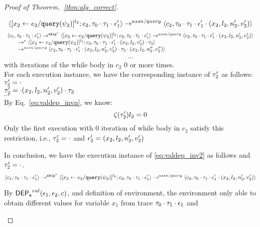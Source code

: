 \begin{proof}[Proof of Theorem.~\ref{thm:alg_correct}]
\begin{case}[$P(\cdot)$]
\begin{subproof}[Subproof]
\begin{enumerate}
\[  \langle [\mathrel{ {x}_2 \leftarrow e_2 / {\tt query}(\psi_2) }]^{l_2} ; {c}_2, \mathtt{\tau}_0 \cdot \mathtt{\tau}_1 \cdot \mathtt{\epsilon}_1' \rangle 
  \rightarrow^{assn/query} 
  \langle {c}_2,  \mathtt{\tau}_0 \cdot \mathtt{\tau}_1 \cdot \mathtt{\epsilon}_1' \cdot (x_2, l_2, n_2', v_2') \rangle 
 \]
%
  \[
  \begin{array}{l}
  \langle c_1, \mathtt{\tau}_0 \cdot \mathtt{\tau}_1 \cdot \mathtt{\epsilon}_1' \rangle 
  \rightarrow^{\mathtt{skip}^*} 
  \langle [\mathrel{ {x}_2 \leftarrow e_2 / {\tt query}(\psi_2) }]^{l_2} ; {c}_2, \mathtt{\tau}_0 \cdot \mathtt{\tau}_1 \cdot \mathtt{\epsilon}_1' \rangle 
  \rightarrow^{assn/query} 
  \langle {c}_2,  \mathtt{\tau}_0 \cdot \mathtt{\tau}_1 \cdot \mathtt{\epsilon}_1' \cdot (x_2, l_2, n_2', v_2') \rangle 
  \\ \qquad
  \rightarrow^{*} 
  \langle [\mathrel{ {x}_2 \leftarrow e_2 / {\tt query}(\psi_2) }]^{l_2} ; {c}_2, 
  \mathtt{\tau}_0 \cdot \mathtt{\tau}_1 \cdot \mathtt{\epsilon}_1' \cdot (x_2, l_2, v_2') \cdot \mathtt{\tau}_3 \rangle 
  \\ \qquad
  \rightarrow^{assn/query} 
  \langle {c}_2,  \mathtt{\tau}_0 \cdot \mathtt{\tau}_1 \cdot \mathtt{\epsilon}_1' \cdot (x_2, l_2, n_2', v_2') \cdot \mathtt{\tau}_3 \cdot (x_2, l_2, n_2'', v_2'') \rangle 
 \end{array}
 \]
\[
  \cdots
\] 
with iterations of the while body in $c_2$ $0$ or more times.
%
\\
%
For each execution instance, we have the corresponding instance of $\mathtt{\tau}_2'$ as follows:
\\
  $\mathtt{\tau}_2'  = \cdot$
\\
$\mathtt{\tau}_2' = \cdot (x_2, l_2, n_2', v_2') \cdot \mathtt{\tau}_3 $
%
\\
$\cdots$
%
\\
%
By Eq.~\ref{eq:valdep_invn}, we know:
%
\[
 \mathtt{\zeta}(\mathtt{\tau}_2') l_2 = 0
\]
%
Only the first execution with 0 iteration of while body in $c_2$ satisfy this restriction, i.e., $\mathtt{\tau}_2' = \cdot$ and $\mathtt{\epsilon}_2' = (x_2, l_2, n_2', v_2')$
%
\end{enumerate}
In conclusion, we have the execution instance of \ref{eq:valdep_inv2}  as follows and $\mathtt{\tau}_2' = \cdot$.
  \[
  \langle c_1, \mathtt{\tau}_0 \cdot \mathtt{\tau}_1 \cdot \mathtt{\epsilon}_1' \rangle 
  \rightarrow^{\mathtt{skip}^*} 
  \langle [\mathrel{ {x}_2 \leftarrow e_2 / {\tt query}(\psi_2) }]^{l_2} ; {c}_2, \mathtt{\tau}_0 \cdot \mathtt{\tau}_1 \cdot \mathtt{\epsilon}_1' \rangle 
  \rightarrow^{assn/query} 
  \langle {c}_2,  \mathtt{\tau}_0 \cdot \mathtt{\tau}_1 \cdot \mathtt{\epsilon}_1' \cdot (x_2, l_2, n_2', v_2') \rangle 
 \]
\end{subproof}
%
By $\mathsf{DEP_{\mathtt{e}}}^{val}(\mathtt{\epsilon}_1, \mathtt{\epsilon}_2, c)$, and definition of environment, 
the environment only able to obtain different values for variable $x_1$ 
from trace $\mathtt{\tau}_0 \cdot \mathtt{\tau}_1 \cdot \mathtt{\epsilon}_1$ and 

\end{case}
\end{proof}
